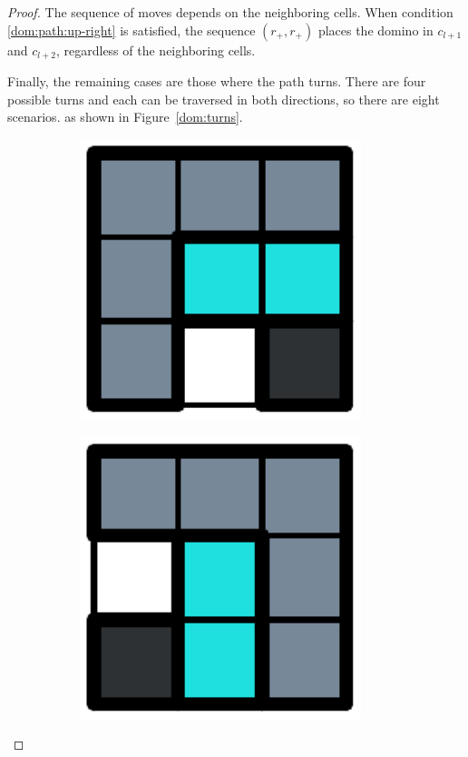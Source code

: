 \begin{proof}
  The sequence of moves depends on the neighboring cells. When condition \ref{dom:path:up-right} is satisfied, the sequence $(r_+, r_+)$ places the domino in $c_{l+1}$ and $c_{l+2}$, regardless of the neighboring cells.

  Finally, the remaining cases are those where the path turns. There are four possible turns and each can be traversed in both directions, so there are eight scenarios. as shown in Figure~\ref{dom:turns}.

\begin{figure}[h]
  \centering
  \begin{subfigure}[b]{0.1\textwidth}
    \centering
    \includegraphics[width=0.9\textwidth]{pictures/dominoes/turns/turn_1.pdf}
    \caption{}
    \label{dom:turn1}
  \end{subfigure}
  \begin{subfigure}[b]{0.1\textwidth}
    \centering
    \includegraphics[width=0.9\textwidth]{pictures/dominoes/turns/turn_2.pdf}

\end{subfigure}
\end{figure}
\end{proof}
